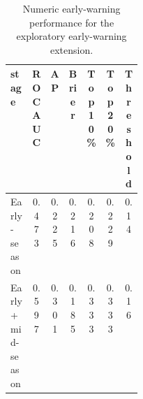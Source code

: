\begin{table}[H]
\centering
\caption{Numeric early-warning performance for the exploratory early-warning extension.}
\label{tab:early_warning_metrics}
\small
\renewcommand{\arraystretch}{1.15}
\begin{tabularx}{\linewidth}{@{}>{\raggedright\arraybackslash}p{0.22\linewidth}cccccc@{}}
\toprule
stage & ROC AUC & AP & Brier & Top 10\% & Top 20\% & Threshold \\
\midrule
Early-season & 0.473 & 0.225 & 0.216 & 0.208 & 0.229 & 0.14 \\
Early + mid-season & 0.597 & 0.301 & 0.185 & 0.333 & 0.333 & 0.16 \\
\bottomrule
\end{tabularx}
\end{table}
